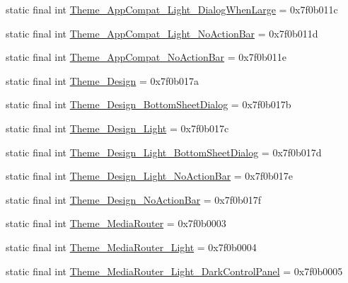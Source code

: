 \begin{CompactItemize}
\item 
static final int \hyperlink{classandroid_1_1support_1_1v7_1_1mediarouter_1_1_r_1_1style_149e4461850d20bc1a83cde0f88cfe3b}{Theme\_\-AppCompat\_\-Light\_\-DialogWhenLarge} = 0x7f0b011c
\item 
static final int \hyperlink{classandroid_1_1support_1_1v7_1_1mediarouter_1_1_r_1_1style_0406c8eff7b1cf54e6128b62e085aa5d}{Theme\_\-AppCompat\_\-Light\_\-NoActionBar} = 0x7f0b011d
\item 
static final int \hyperlink{classandroid_1_1support_1_1v7_1_1mediarouter_1_1_r_1_1style_bd3e6ad4451d7056b7118752f7855825}{Theme\_\-AppCompat\_\-NoActionBar} = 0x7f0b011e
\item 
static final int \hyperlink{classandroid_1_1support_1_1v7_1_1mediarouter_1_1_r_1_1style_83b011cc2e2174efd20009c45ccce040}{Theme\_\-Design} = 0x7f0b017a
\item 
static final int \hyperlink{classandroid_1_1support_1_1v7_1_1mediarouter_1_1_r_1_1style_e962c8d55b8ea7cb16fc4cc2ee5b1020}{Theme\_\-Design\_\-BottomSheetDialog} = 0x7f0b017b
\item 
static final int \hyperlink{classandroid_1_1support_1_1v7_1_1mediarouter_1_1_r_1_1style_bd0f8c27597309c75653844f789a6052}{Theme\_\-Design\_\-Light} = 0x7f0b017c
\item 
static final int \hyperlink{classandroid_1_1support_1_1v7_1_1mediarouter_1_1_r_1_1style_82a2c328bd50d41d8e7ab4db341fd000}{Theme\_\-Design\_\-Light\_\-BottomSheetDialog} = 0x7f0b017d
\item 
static final int \hyperlink{classandroid_1_1support_1_1v7_1_1mediarouter_1_1_r_1_1style_94084e079f0c00bbce8d8524c156f241}{Theme\_\-Design\_\-Light\_\-NoActionBar} = 0x7f0b017e
\item 
static final int \hyperlink{classandroid_1_1support_1_1v7_1_1mediarouter_1_1_r_1_1style_452755a0fb70500fe04c0a70c1eede2e}{Theme\_\-Design\_\-NoActionBar} = 0x7f0b017f
\item 
static final int \hyperlink{classandroid_1_1support_1_1v7_1_1mediarouter_1_1_r_1_1style_c13a9ad6367f98e1696b8676670821e0}{Theme\_\-MediaRouter} = 0x7f0b0003
\item 
static final int \hyperlink{classandroid_1_1support_1_1v7_1_1mediarouter_1_1_r_1_1style_790671ca41c72d3d2a08e58d9670a864}{Theme\_\-MediaRouter\_\-Light} = 0x7f0b0004
\item 
static final int \hyperlink{classandroid_1_1support_1_1v7_1_1mediarouter_1_1_r_1_1style_4f354145c9c66f9747ca298fd7f19f04}{Theme\_\-MediaRouter\_\-Light\_\-DarkControlPanel} = 0x7f0b0005

\end{CompactItemize}
